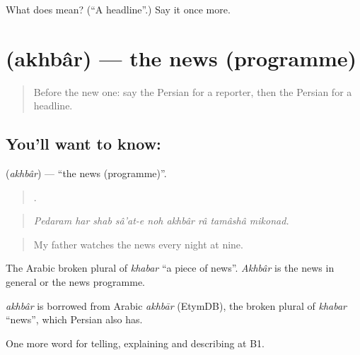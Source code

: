 \begin{tcolorbox}[breakable,colback=teal!4,colframe=teal!35!black,title={Before you move on}]
What does  mean? (\textquotedblleft{}A headline\textquotedblright{}.) Say it once more.
\end{tcolorbox}
\section[\texorpdfstring{\fa{اخبار} (akhbâr)}{اخبار (akhbâr)}]{ (akhbâr) — the news (programme)}

\label{lesson:FA-C308-akhbar}



\begin{quote}
Before the new one: say the Persian for a reporter, then the Persian for a headline.
\end{quote}

\subsection*{You'll want to know: }
\textbf{} (\emph{akhbâr}) — \textquotedblleft{}the news (programme)\textquotedblright{}.

\begin{quote}
        .
\end{quote}

\begin{quote}
\emph{Pedaram har shab sâ'at-e noh akhbâr râ tamâshâ mikonad.}
\end{quote}

\begin{quote}
My father watches the news every night at nine.
\end{quote}

The Arabic broken plural of \emph{khabar} \textquotedblleft{}a piece of news\textquotedblright{}. \emph{Akhbâr} is the news in general or the news programme.

\begin{cousinweb}
\emph{akhbâr} is borrowed from Arabic \emph{akhbār} (EtymDB), the broken plural of \emph{khabar} \textquotedblleft{}news\textquotedblright{}, which Persian also has.
\end{cousinweb}

\begin{grammarlens}[title={What you've built}]
One more word for telling, explaining and describing at B1.
\end{grammarlens}

